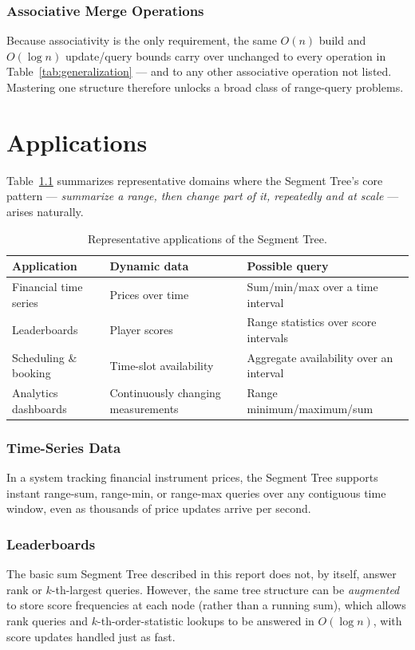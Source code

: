 \documentclass[11pt,open=any,headings=option]{scrreprt}
\begin{document}
\subsection{Associative Merge Operations}
Because associativity is the only requirement, the same $O(n)$ build and $O(\log n)$ update/query bounds carry over unchanged to every operation in Table~\ref{tab:generalization} --- and to any other associative operation not listed. Mastering one structure therefore unlocks a broad class of range-query problems.

\chapter{Applications}

Table~\ref{tab:applications} summarizes representative domains where the Segment Tree's core pattern --- \emph{summarize a range, then change part of it, repeatedly and at scale} --- arises naturally.

\begin{table}[h]
\centering
\caption{Representative applications of the Segment Tree.}
\label{tab:applications}
\begin{tabular}{p{3.1cm}p{4.3cm}p{5.3cm}}
\toprule
\textbf{Application} & \textbf{Dynamic data} & \textbf{Possible query} \\
\midrule
Financial time series & Prices over time & Sum/min/max over a time interval \\
Leaderboards & Player scores & Range statistics over score intervals \\
Scheduling \& booking & Time-slot availability & Aggregate availability over an interval \\
Analytics dashboards & Continuously changing measurements & Range minimum/maximum/sum \\
\bottomrule
\end{tabular}
\end{table}

\subsection{Time-Series Data}
In a system tracking financial instrument prices, the Segment Tree supports instant range-sum, range-min, or range-max queries over any contiguous time window, even as thousands of price updates arrive per second.

\subsection{Leaderboards}
The basic sum Segment Tree described in this report does not, by itself, answer rank or $k$-th-largest queries. However, the same tree structure can be \emph{augmented} to store score frequencies at each node (rather than a running sum), which allows rank queries and $k$-th-order-statistic lookups to be answered in $O(\log n)$, with score updates handled just as fast.
\end{document}
